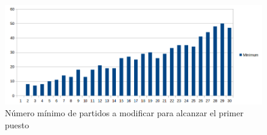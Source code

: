 \begin{figure}[h!]
  \begin{center}
	\includegraphics[scale=0.50]{imagenes/cualitative/greedy/minimum.png}
	\caption{N\'umero m\'inimo de partidos a modificar para alcanzar el primer puesto}
	\label{minimum}
  \end{center}
\end{figure}
